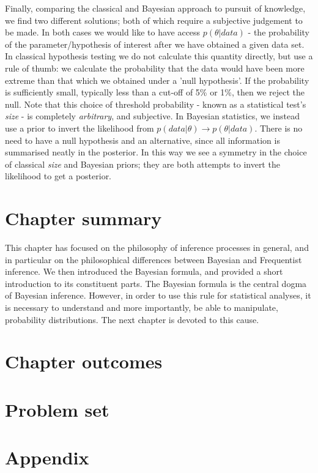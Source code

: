 \documentclass[11pt,fullpage]{book}
\begin{document}
Finally, comparing the classical and Bayesian approach to pursuit of knowledge, we find two different solutions; both of which require a subjective judgement to be made. In both cases we would like to have access $p(\theta|data)$ - the probability of the parameter/hypothesis of interest after we have obtained a given data set. In classical hypothesis testing we do not calculate this quantity directly, but use a rule of thumb: we calculate the probability that the data would have been more extreme than that which we obtained under a 'null hypothesis'. If the probability is sufficiently small, typically less than a cut-off of 5\% or 1\%, then we reject the null. Note that this choice of threshold probability - known as a statistical test's \textit{size} - is completely \textit{arbitrary}, and subjective. In Bayesian statistics, we instead use a prior to invert the likelihood from $p(data|\theta)\rightarrow p(\theta|data)$. There is no need to have a null hypothesis and an alternative, since all information is summarised neatly in the posterior. In this way we see a symmetry in the choice of classical \textit{size} and Bayesian priors; they are both attempts to invert the likelihood to get a posterior. 

\section{Chapter summary}
This chapter has focused on the philosophy of inference processes in general, and in particular on the philosophical differences between Bayesian and Frequentist inference. We then introduced the Bayesian formula, and provided a short introduction to its constituent parts. The Bayesian formula is the central dogma of Bayesian inference. However, in order to use this rule for statistical analyses, it is necessary to understand and more importantly, be able to manipulate, probability distributions. The next chapter is devoted to this cause.

\section{Chapter outcomes}

\section{Problem set}


\section{Appendix}
\end{document}
